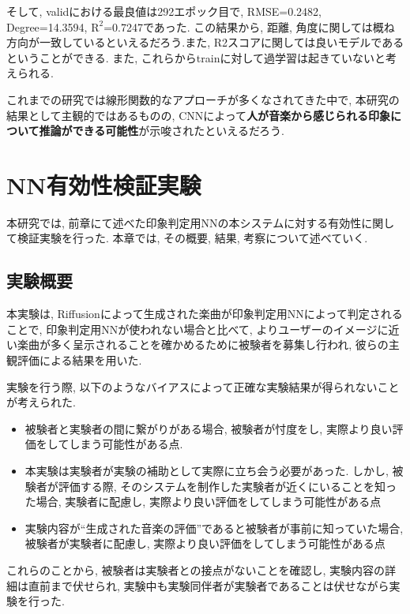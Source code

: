 \documentclass[a4paper,11pt,dvipdfmx]{jreport}
\begin{document}
そして, validにおける最良値は292エポック目で, RMSE=0.2482, Degree=14.3594, $\mathrm{R^2}$=0.7247であった. この結果から, 距離, 角度に関しては概ね方向が一致しているといえるだろう.また, R2スコアに関しては良いモデルであるということができる.
また, これらからtrainに対して過学習は起きていないと考えられる.

これまでの研究では線形関数的なアプローチが多くなされてきた中で, 本研究の結果として主観的ではあるものの, CNNによって\textbf{人が音楽から感じられる印象について推論ができる可能性}が示唆されたといえるだろう.

\chapter{NN有効性検証実験}
本研究では, 前章にて述べた印象判定用NNの本システムに対する有効性に関して検証実験を行った.
本章では, その概要, 結果, 考察について述べていく.
\section{実験概要}
本実験は, Riffusionによって生成された楽曲が印象判定用NNによって判定されることで, 印象判定用NNが使われない場合と比べて, よりユーザーのイメージに近い楽曲が多く呈示されることを確かめるために被験者を募集し行われ, 彼らの主観評価による結果を用いた.

実験を行う際, 以下のようなバイアスによって正確な実験結果が得られないことが考えられた.
\begin{itemize}
  \item 被験者と実験者の間に繋がりがある場合, 被験者が忖度をし, 実際より良い評価をしてしまう可能性がある点.
  \item 本実験は実験者が実験の補助として実際に立ち会う必要があった. 
        しかし, 被験者が評価する際, そのシステムを制作した実験者が近くにいることを知った場合, 
        実験者に配慮し, 実際より良い評価をしてしまう可能性がある点
  \item 実験内容が``生成された音楽の評価''であると被験者が事前に知っていた場合,
        被験者が実験者に配慮し, 実際より良い評価をしてしまう可能性がある点
\end{itemize}
これらのことから, 被験者は実験者との接点がないことを確認し, 実験内容の詳細は直前まで伏せられ, 
実験中も実験同伴者が実験者であることは伏せながら実験を行った.
\end{document}
